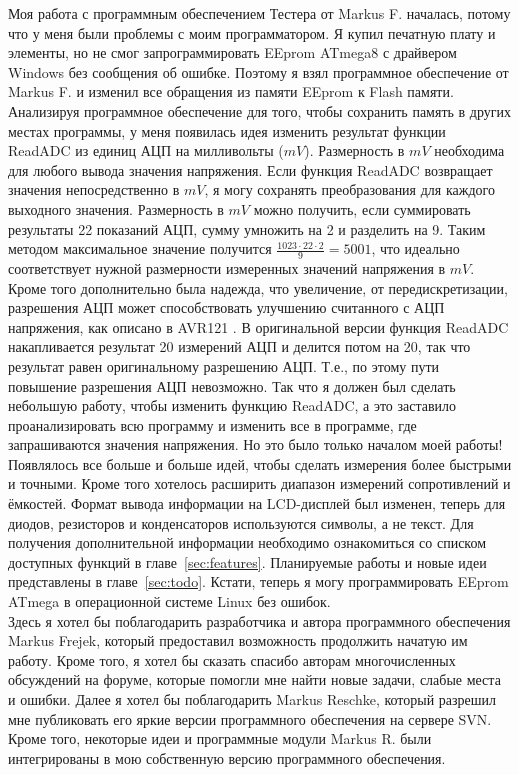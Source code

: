 Моя работа с программным обеспечением Тестера от Markus F.\cite{Frejek} началась, потому что у меня были проблемы с 
моим программатором. Я купил печатную плату и элементы, но не смог запрограммировать EEprom ATmega8 с драйвером Windows 
без сообщения об ошибке. Поэтому я взял программное обеспечение от Markus F. и изменил все обращения из памяти EEprom 
к Flash памяти. Анализируя программное обеспечение для того, чтобы сохранить память в других местах программы, у меня 
появилась идея изменить результат функции ReadADC из единиц АЦП на милливольты (\(mV\)). Размерность в \(mV\) необходима 
для любого вывода значения напряжения. Если функция ReadADC возвращает значения непосредственно в \(mV\), я могу 
сохранять преобразования для каждого выходного значения. Размерность в \(mV\) можно получить, если суммировать 
результаты 22 показаний АЦП, сумму умножить на 2 и разделить на 9. Таким методом максимальное значение получится 
\begin{math}\frac{1023\cdot22\cdot2}{9} = 5001\end{math},  что идеально соответствует нужной размерности измеренных 
значений напряжения в \(mV\). Кроме того дополнительно была надежда, что увеличение, от передискретизации, 
разрешения АЦП может способствовать улучшению считанного с АЦП напряжения, как описано в AVR121 \cite{AVR121}. 
В оригинальной версии функция ReadADC накапливается результат 20 измерений АЦП и делится потом на 20, так что результат 
равен оригинальному разрешению АЦП. Т.е., по этому пути повышение разрешения АЦП невозможно. Так что я должен был 
сделать небольшую работу, чтобы изменить функцию ReadADC, а это заставило проанализировать всю программу и изменить все 
 в программе, где запрашиваются значения напряжения. Но это было только началом моей работы!\\

Появлялось все больше и больше идей, чтобы сделать измерения более быстрыми и точными. Кроме того хотелось расширить 
диапазон измерений сопротивлений и ёмкостей. Формат вывода информации на LCD-дисплей был изменен, теперь для диодов, 
резисторов и конденсаторов используются символы, а не текст. Для получения дополнительной информации необходимо 
ознакомиться со списком доступных функций в главе~\ref{sec:features}. Планируемые работы и новые идеи представлены 
в главе~\ref{sec:todo}. Кстати, теперь я могу программировать EEprom ATmega в операционной системе Linux без ошибок.\\

Здесь я хотел бы поблагодарить разработчика и автора программного обеспечения Markus Frejek, который предоставил 
возможность продолжить начатую им работу. Кроме того, я хотел бы сказать спасибо авторам многочисленных обсуждений 
на форуме, которые помогли мне найти новые задачи, слабые места и ошибки. Далее я хотел бы поблагодарить Markus 
Reschke, который разрешил мне публиковать его яркие версии программного обеспечения на сервере SVN. 
Кроме того, некоторые идеи и программные модули Markus R. были интегрированы в мою собственную версию программного 
обеспечения.

